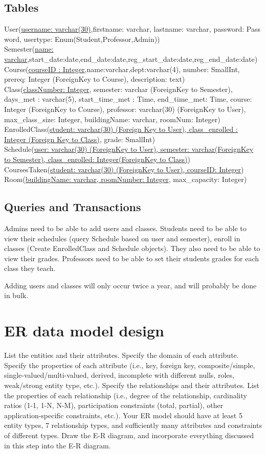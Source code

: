 \documentclass[11pt,oneside,a4paper]{article}
\begin{document}
\subsection{Tables}
User(\underline{username: varchar(30)},firstname: varchar, lastname: varchar,
password: Pass	word, usertype: Enum(Student,Professor,Admin))
\\
Semester(\underline{name: varchar},start\_date:date,end\_date:date,reg\_start\_date:date,reg\_end\_date:date)
\\
Course(\underline{courseID	: Integer},name:varchar,dept:varchar(4), number:
SmallInt, prereq: Integer (ForeignKey to Course), description: text)
\\
Class(\underline{classNumber: Integer}, semester: varchar (ForeignKey to
Semester), days\_met : varchar(5), start\_time\_met : Time, end\_time\_met:
Time, course: Integer (ForeignKey to Course), professor: varchar(30)
(ForeignKey to User), max\_class\_size: Integer, buildingName: varchar,
roomNum: Integer)
\\
EnrolledClass(\underline{student: varchar(30) (Foreign Key to User), class\_enrolled : Integer (Foreign Key to Class)}, grade: SmallInt)
\\
Schedule(\underline{user: varchar(30) (ForeignKey to User), semester: varchar(ForeignKey to Semester), class\_enrolled: Integer(ForeignKey to Class)})
\\
CoursesTaken(\underline{student: varchar(30) (ForeignKey to User), courseID: Integer}) \\
Room(\underline{buildingName: varchar, roomNumber: Integer}, max\_capacity:
Integer)
\subsection{Queries and Transactions}
Admins need to be able to add users and classes. Students need to be able to
view their schedules (query Schedule based on user and semester), enroll in classes (Create EnrolledClass and Schedule
objects). They also need to be able to view their grades. Professors need to be
able to set their students grades for each class they teach.

Adding users and classes will only occur twice a year, and will probably be
done in bulk.
	
\section{ER data model design}
List the entities and their attributes. Specify the domain of each attribute. Specify the properties of each attribute (i.e., key, foreign key, composite/simple, single-valued/multi-valued, derived, incomplete with different nulls, roles, weak/strong entity type, etc.). Specify the relationships and their attributes. List the properties of each relationship (i.e., degree of the relationship, cardinality ratios (1-1, 1-N, N-M), participation constraints (total, partial), other application-specific constraints, etc.). Your ER model should have at least 5 entity types, 7 relationship types, and sufficiently many attributes and constraints of different types. Draw the E-R diagram, and incorporate everything discussed in this step into the E-R diagram. 
\end{document}
